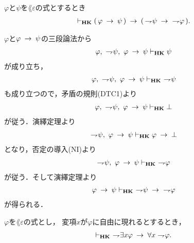 	\begin{screen}
		\begin{thm}[対偶律$1$]\label{classic:contraposition_1}
			$\varphi$と$\psi$を$\lang{\varepsilon}$の式とするとき
			\begin{align}
				\vdash_{{\scriptsize \mbox{{\bf HK}}}} (\, \varphi \hspace{0.25em}\rightarrow\hspace{0.25em} \psi\, )
				\hspace{0.25em}\rightarrow\hspace{0.25em} (\, \rightharpoondown\hspace{-0.25em} \psi \hspace{0.25em}\rightarrow\hspace{0.25em}\ \rightharpoondown\hspace{-0.25em} \varphi\, ).
			\end{align}
		\end{thm}
	\end{screen}
	
	\begin{sketch}
		$\varphi$と$\varphi \hspace{0.25em}\rightarrow\hspace{0.25em} \psi$の三段論法から
		\begin{align}
			\varphi,\ \rightharpoondown\hspace{-0.25em} \psi,\ \varphi \hspace{0.25em}\rightarrow\hspace{0.25em} \psi
			\vdash_{{\scriptsize \mbox{{\bf HK}}}} \psi
		\end{align}
		が成り立ち，
		\begin{align}
			\varphi,\ \rightharpoondown\hspace{-0.25em} \psi,\ \varphi \hspace{0.25em}\rightarrow\hspace{0.25em} \psi
			\vdash_{{\scriptsize \mbox{{\bf HK}}}}\ \rightharpoondown\hspace{-0.25em} \psi
		\end{align}
		も成り立つので，矛盾の規則(DTC1)より
		\begin{align}
			\varphi,\ \rightharpoondown\hspace{-0.25em} \psi,\ \varphi \hspace{0.25em}\rightarrow\hspace{0.25em} \psi
			\vdash_{{\scriptsize \mbox{{\bf HK}}}} \bot
		\end{align}
		が従う．演繹定理より
		\begin{align}
			\rightharpoondown\hspace{-0.25em} \psi,\ \varphi \hspace{0.25em}\rightarrow\hspace{0.25em} \psi
			\vdash_{{\scriptsize \mbox{{\bf HK}}}} \varphi \hspace{0.25em}\rightarrow\hspace{0.25em} \bot
		\end{align}
		となり，否定の導入(NI)より
		\begin{align}
			\rightharpoondown\hspace{-0.25em} \psi,\ \varphi \hspace{0.25em}\rightarrow\hspace{0.25em} \psi
			\vdash_{{\scriptsize \mbox{{\bf HK}}}}\ \rightharpoondown\hspace{-0.25em} \varphi
		\end{align}
		が従う．そして演繹定理より
		\begin{align}
			\varphi \rarrow \psi
			\provable{\mbox{{\bf HK}}}\ \negation \psi \rarrow\ \negation \varphi
		\end{align}
		が得られる．
		\QED
	\end{sketch}
	
	\begin{screen}
		\begin{thm}
		\label{classic:weak_De_Morgan_law_for_quantifier_1}
			$\varphi$を$\lang{\varepsilon}$の式とし，
			変項$x$が$\varphi$に自由に現れるとするとき，
			\begin{align}
				\vdash_{{\scriptsize \mbox{{\bf HK}}}}
				\ \rightharpoondown\hspace{-0.25em} \exists x \varphi \hspace{0.25em}\rightarrow\hspace{0.25em} \forall x \rightharpoondown\hspace{-0.25em} \varphi.
			\end{align}
		\end{thm}
	\end{screen}
	
